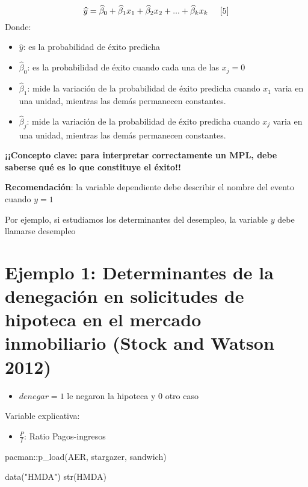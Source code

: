 \documentclass[
  letterpaper,
  DIV=11,
  numbers=noendperiod]{scrreprt}
\newenvironment{Shaded}{\begin{snugshade}}{\end{snugshade}}
\newcommand{\FunctionTok}[1]{\textcolor[rgb]{0.28,0.35,0.67}{#1}}
\newcommand{\NormalTok}[1]{\textcolor[rgb]{0.00,0.23,0.31}{#1}}
\newcommand{\SpecialCharTok}[1]{\textcolor[rgb]{0.37,0.37,0.37}{#1}}
\newcommand{\StringTok}[1]{\textcolor[rgb]{0.13,0.47,0.30}{#1}}
\providecommand{\tightlist}{%
  \setlength{\itemsep}{0pt}\setlength{\parskip}{0pt}}\usepackage{longtable,booktabs,array}
\begin{document}
\[
\widehat{y}=\widehat{\beta}_0+\widehat{\beta}_1x_1+\widehat{\beta}_2x_2+...+\widehat{\beta}_kx_k \hspace{0.5cm} [5]
\] Donde:

\begin{itemize}
\item
  \(\widehat{y}\): es la probabilidad de éxito predicha
\item
  \(\widehat{\beta}_0\): es la probabilidad de éxito cuando cada una de
  las \(x_j=0\)
\item
  \(\widehat{\beta}_1\): mide la variación de la probabilidad de éxito
  predicha cuando \(x_1\) varia en una unidad, mientras las demás
  permanecen constantes.
\item
  \(\widehat{\beta}_j\): mide la variación de la probabilidad de éxito
  predicha cuando \(x_j\) varia en una unidad, mientras las demás
  permanecen constantes.
\end{itemize}

\textbf{¡¡Concepto clave: para interpretar correctamente un MPL, debe
saberse qué es lo que constituye el éxito!!}

\textbf{Recomendación}: la variable dependiente debe describir el nombre
del evento cuando \(y=1\)

Por ejemplo, si estudiamos los determinantes del desempleo, la variable
\(y\) debe llamarse desempleo

\section{Ejemplo 1: Determinantes de la denegación en solicitudes de
hipoteca en el mercado inmobiliario (Stock and Watson
2012)}\label{ejemplo-1-determinantes-de-la-denegaciuxf3n-en-solicitudes-de-hipoteca-en-el-mercado-inmobiliario-stock2012}

\begin{itemize}
\tightlist
\item
  \(denegar=1\) le negaron la hipoteca y \(0\) otro caso
\end{itemize}

Variable explicativa:

\begin{itemize}
\tightlist
\item
  \(\frac{P}{I}\): Ratio Pagos-ingresos
\end{itemize}

\begin{Shaded}
\begin{Highlighting}[]
\NormalTok{pacman}\SpecialCharTok{::}\FunctionTok{p\_load}\NormalTok{(AER, }
\NormalTok{               stargazer,}
\NormalTok{               sandwich)}

\FunctionTok{data}\NormalTok{(}\StringTok{"HMDA"}\NormalTok{)}
\FunctionTok{str}\NormalTok{(HMDA)}
\end{Highlighting}
\end{Shaded}
\end{document}
